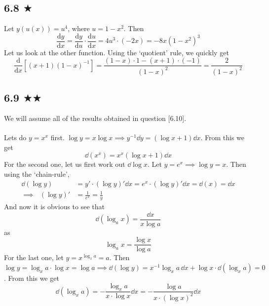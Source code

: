 \subsection{6.8 $\bigstar$}
Let $y(u(x))=u^4$, where $u=1-x^2$. Then
$$\frac{\text{d} y}{\text{d}x}=\frac{\text{d} y}{\text{d}u}\cdot\frac{\text{d} u}{\text{d}x}=4u^3\cdot (-2x)=-8x(1-x^2)^3$$
Let us look at the other function. Using the `quotient' rule, we quickly get
$$\frac{\text{d} }{\text{d}x}[(x+1)(1-x)^{-1}]=\frac{(1-x)\cdot 1 -(x+1)\cdot (-1)}{(1-x)^2}=\frac{2}{(1-x)^2}$$


\subsection{6.9 $\bigstar\bigstar$}
We will assume all of the results obtained in question [6.10]. \\ \\ Lets do $y=x^x$ first. $\log y=x\log x\implies y^{-1}\dd y=(\log x +1)\dd x$. From this we get
$$\dd(x^x)= x^x(\log x +1)\dd x$$ 
For the second one, let us first work out $\dd \log x$. Let $y=e^x\implies \log y = x$. Then using the `chain-rule', 
\begin{align*}
\dd(\log y)&=y'\cdot (\log y)'\dd x=e^x\cdot (\log y)'\dd x=\dd(x)=\dd x\\
\implies \ \ \ (\log y)'&=\frac{1}{e^x}=\frac{1}{y}
\end{align*}
And now it is obvious to see that
$$\dd(\log_a x)=\frac{\dd x}{x \log a}$$
as $$\log_a x=\frac{\log x}{\log a}$$
For the last one, let $y=x^{\log_x a}=a$. Then $\log y = \log_x a \cdot \log x=\log a \implies \dd(\log y)=x^{-1}\log_x a\,\dd x+\log x\cdot \dd(\log_x a)=0$. From this we get
$$ \dd(\log_x a)=-\frac{\log_x a}{x\cdot \log x}\dd x=-\frac{\log a}{x\cdot (\log x)^2}\dd x$$


